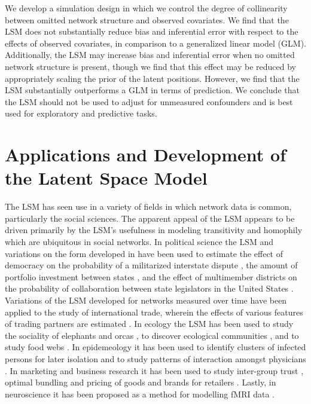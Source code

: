 \documentclass[11pt]{article}
\begin{document}
We develop a simulation design in which we control the degree of collinearity between omitted network structure and observed covariates. We find that the LSM does not substantially reduce bias and inferential error with respect to the effects of observed covariates, in comparison to a generalized linear model (GLM). Additionally, the LSM may increase bias and inferential error when no omitted network structure is present, though we find that this effect may be reduced by appropriately scaling the prior of the latent positions. However, we find that the LSM substantially outperforms a GLM in terms of prediction. We conclude that the LSM should not be used to adjust for unmeasured confounders and is best used for exploratory and predictive tasks.

\section{Applications and Development of the Latent Space Model}

The LSM has seen use in a variety of fields in which network data is common, particularly the social sciences. The apparent appeal of the LSM appears to be driven primarily by the LSM's usefulness in modeling transitivity and homophily which are ubiquitous in social networks. In political science the LSM and variations on the form developed in \cite{hoff2002latent} have been used to estimate the effect of democracy on the probability of a militarized interstate dispute \citep{ward2007disputes}, the amount of portfolio investment between states \citep{cao2013democracies}, and the effect of multimember districts on the probability of collaboration between state legislators in the United States \citep{kirkland2012multimember}. Variations of the LSM developed for networks measured over time have been applied to the study of international trade, wherein the effects of various features of trading partners are estimated \citep{ward2013gravity}. In ecology the LSM has been used to study the sociality of elephants \citep{vance2009social} and orcas \citep{fearnbach2014spatial}, to discover ecological communities \citep{fletcher2011social, fletcher2013network}, and to study food webs \citep{chiu2011unifying}. In epidemeology it has been used to identify clusters of infected persons for later isolation \citep{zhang2015cluster} and to study patterns of interaction amongst physicians \citep{paul2014results}. In marketing and business research it has been used to study inter-group trust \citep{dass2011impact}, optimal bundling and pricing of goods and brands for retailers \citep{dass2012assessing}. Lastly, in neuroscience it has been proposed as a method for modelling fMRI data \citep{simpson2013analyzing}.
\end{document}
